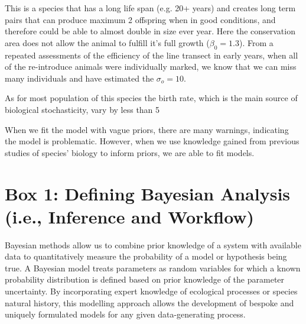 \documentclass{article}
\begin{document}
\par This is a species that has a long life span (e.g. 20+ years) and creates long term pairs  that can produce maximum 2 offspring when in good conditions, and therefore could be able to almost double in size ever year. Here the conservation area does not allow the animal to fulfill it's full growth ($\beta_0 = 1.3$). From a repeated assessments of the efficiency of the line transect in early years, when all of the re-introduce animals were individually marked, we know that we can miss many individuals and have estimated the $\sigma_o = 10$.

\par As for most population of this species the birth rate, which is the main source of biological stochasticity, vary by less than 5%

\par When we fit the model with vague priors, there are many warnings, indicating the model is problematic. However, when we use knowledge gained from previous studies of species' biology to inform priors, we are able to fit models.

\par 
\section* {Box 1: Defining Bayesian Analysis (i.e., Inference and Workflow)}

Bayesian methods allow us to combine prior knowledge of a system with available data to quantitatively measure the probability of a model or hypothesis being true. A Bayesian model treats parameters as random variables for which a known probability distribution is defined based on prior knowledge of the parameter uncertainty. By incorporating expert knowledge of ecological processes or species natural history, this modelling approach allows the development of bespoke and uniquely formulated models for any given data-generating process.\\
\end{document}
